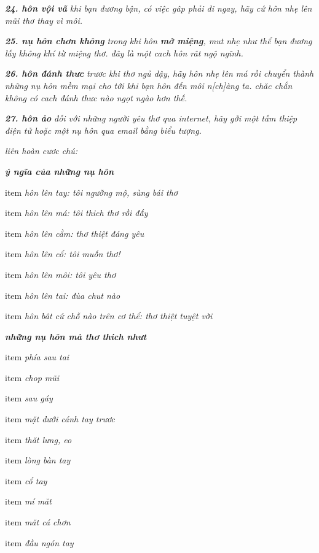\documentclass[../main.tex]{subfiles}
\begin{document}
\begin{multicols}{2}
\begin{blockquote}
\textit{\textbf{24. hôn vội vã } 
} 
\textit{khi bạn đương bận, có việc gâp phải đi ngay, hãy cứ hôn nhẹ lên mũi thơ thay vì môi. } 
 
\textit{\textbf{25. nụ hôn chơn không}  
} 
\textit{trong khi hôn \textbf{mở miệng}, mut nhẹ như thể bạn đương lấy không khí từ miệng thơ. đây là một cach hôn rât ngộ ngĩnh. } 
 
\textit{\textbf{26. hôn đánh thưc } 
} 
\textit{trươc khi thơ ngủ dậy, hãy hôn nhẹ lên má rồi chuyển thành những nụ hôn mềm mại cho tới khi bạn hôn đến môi n[ch]àng ta. chăc chắn không có cach đánh thưc nào ngọt ngào hơn thế. } 
 
\textit{\textbf{27. hôn ảo } 
} 
\textit{đối với những người yêu thơ qua internet, hãy gởi một tấm thiệp điện tử hoặc một nụ hôn qua email bằng biểu tượng.} 
 
\textit{liên hoàn cươc chú:} 
 
\textit{\textbf{ý ngĩa của những nụ hôn }}  
\begin{itemize}

item{
\textit{hôn lên tay: tôi ngưỡng mộ, sùng bái thơ } }

item{
\textit{hôn lên má: tôi thich thơ rồi đấy } }

item{
\textit{hôn lên cằm: thơ thiệt đáng yêu } }

item{
\textit{hôn lên cổ: tôi muốn thơ! } }

item{
\textit{hôn lên môi: tôi yêu thơ } }

item{
\textit{hôn lên tai: đùa chut nào } }

item{
\textit{hôn bât cứ chỗ nào trên cơ thể: thơ thiệt tuyệt vời } }

\end{itemize}
 \textit{\textbf{những nụ hôn mà thơ thich nhưt}}  
\begin{enumerate}

item{
\textit{ phía sau tai } }

item{
\textit{ chop mũi } }

item{
\textit{ sau gáy } }

item{
\textit{ mặt dưới cánh tay trươc } }

item{
\textit{ thăt lưng, eo } }

item{
\textit{ lòng bàn tay } }

item{
\textit{ cổ tay } }

item{
\textit{ mí măt } }

item{
\textit{ măt cá chơn } }

item{
\textit{ đầu ngón tay } }


\end{enumerate}
\end{blockquote}
\end{multicols}
\end{document}
